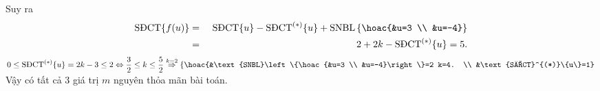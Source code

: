 \begin{ex}
{Suy ra
{\allowdisplaybreaks
\begin{eqnarray*}
\text{SĐCT}\{f(u)\}&=&\text{ SĐCT}\{u\}-\text{SĐCT}^{(*)}\{u\}+\text{SNBL}\left\{\hoac{&u=3 \\ &u=-4}\right\}\\
&=&2+2 k-\text{SĐCT}^{(*)}\{u\}=5.
\end{eqnarray*}}
$0 \leq \text{SĐCT}^{(*)}\{u\}=2 k-3 \leq 2 \Leftrightarrow \dfrac{3}{2} \leq k \leq \dfrac{5}{2} \stackrel{k=2}{\Rightarrow}\left\{\hoac{&\text{SNBL}\left\{\hoac{&u=3 \\ &u=-4}\right\}=2 k=4. \\ &\text{SĐCT}^{(*)}\{u\}=1}\right .$\\
Vậy có tất cả $ 3 $ giá trị $m$ nguyên thỏa mãn bài toán.
}
\end{ex}
